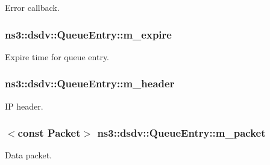 Error callback. 

\subsubsection[{\texorpdfstring{m\+\_\+expire}{m_expire}}]{ ns3\+::dsdv\+::\+Queue\+Entry\+::m\+\_\+expire\hspace{0.3cm}{\ttfamily [private]}}\hypertarget{classns3_1_1dsdv_1_1QueueEntry_acf301260f61bf4165e298e2d87f407e9}{}\label{classns3_1_1dsdv_1_1QueueEntry_acf301260f61bf4165e298e2d87f407e9}


Expire time for queue entry. 

\subsubsection[{\texorpdfstring{m\+\_\+header}{m_header}}]{ ns3\+::dsdv\+::\+Queue\+Entry\+::m\+\_\+header\hspace{0.3cm}{\ttfamily [private]}}\hypertarget{classns3_1_1dsdv_1_1QueueEntry_aba9e576a27ce759f07f32f014c7dd34a}{}\label{classns3_1_1dsdv_1_1QueueEntry_aba9e576a27ce759f07f32f014c7dd34a}


IP header. 

\subsubsection[{\texorpdfstring{m\+\_\+packet}{m_packet}}]{$<$const {\bf Packet}$>$ ns3\+::dsdv\+::\+Queue\+Entry\+::m\+\_\+packet\hspace{0.3cm}{\ttfamily [private]}}\hypertarget{classns3_1_1dsdv_1_1QueueEntry_a6402b0428fa03fc63051c78363b53885}{}\label{classns3_1_1dsdv_1_1QueueEntry_a6402b0428fa03fc63051c78363b53885}


Data packet. 

